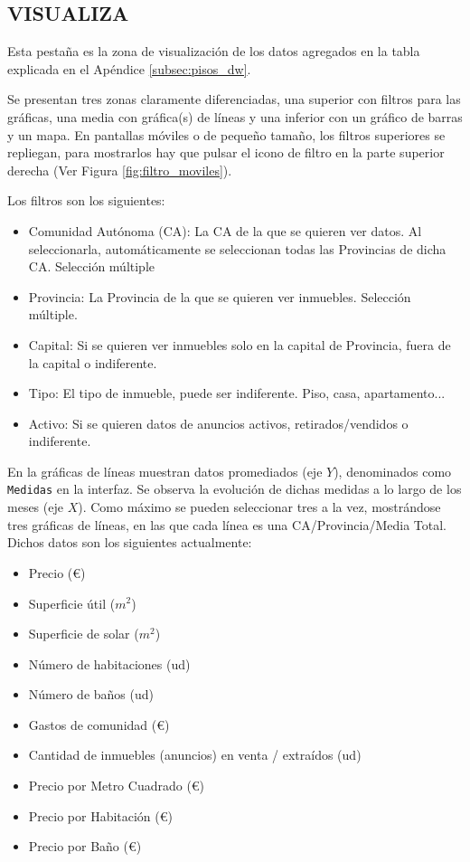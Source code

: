 \clearpage
\subsection{VISUALIZA}{\label{sec:web_visualiza}}

Esta pestaña es la zona de visualización de los datos agregados en la tabla explicada en el Apéndice \ref{subsec:pisos_dw}.

Se presentan tres zonas claramente diferenciadas, una superior con filtros para las gráficas, una media con gráfica(s) de líneas y una inferior con un gráfico de barras y un mapa. En pantallas móviles o de pequeño tamaño, los filtros superiores se repliegan, para mostrarlos hay que pulsar el icono de filtro en la parte superior derecha (Ver Figura \ref{fig:filtro_moviles}).

Los filtros son los siguientes:

\begin{itemize}
    \item Comunidad Autónoma (CA): La CA de la que se quieren ver datos. Al seleccionarla, automáticamente se seleccionan todas las Provincias de dicha CA. Selección múltiple
    \item Provincia: La Provincia de la que se quieren ver inmuebles. Selección múltiple.
    \item Capital: Si se quieren ver inmuebles solo en la capital de Provincia, fuera de la capital o indiferente.
    \item Tipo: El tipo de inmueble, puede ser indiferente. Piso, casa, apartamento...
    \item Activo: Si se quieren datos de anuncios activos, retirados/vendidos o indiferente.
\end{itemize}

En la gráficas de líneas muestran datos promediados (eje $Y$), denominados como \texttt{Medidas} en la interfaz. Se observa la evolución de dichas medidas a lo largo de los meses (eje $X$). Como máximo se pueden seleccionar tres a la vez, mostrándose tres gráficas de líneas, en las que cada línea es una CA/Provincia/Media Total. Dichos datos son los siguientes actualmente:

\begin{itemize}
    \item Precio (€)
    \item Superficie útil ($m^2$)
    \item Superficie de solar ($m^2$)
    \item Número de habitaciones (ud)
    \item Número de baños (ud)
    \item Gastos de comunidad (€)
    \item Cantidad de inmuebles (anuncios) en venta / extraídos (ud)
    \item Precio por Metro Cuadrado (€)
    \item Precio por Habitación (€)
    \item Precio por Baño (€)
\end{itemize}

